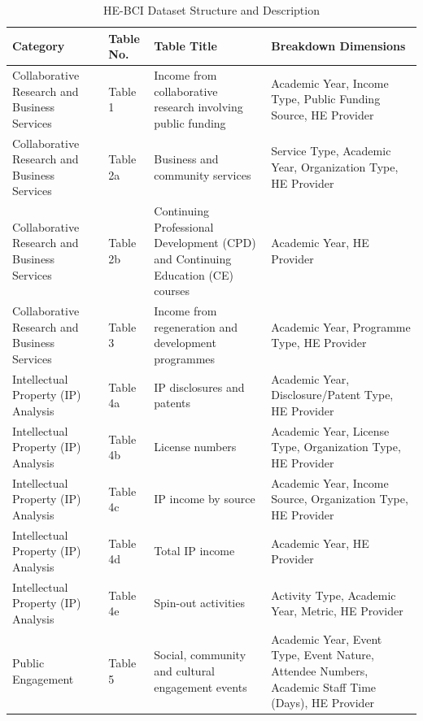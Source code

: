 \documentclass[journal,onecolumn, 10pt,draftclsnofoot]{IEEEtran}
\begin{document}
\vspace{0.3cm}
\begin{table}[h]
\centering
\caption{HE-BCI Dataset Structure and Description}
\vspace{0.1cm}
\renewcommand{\arraystretch}{1.15}
\small
\begin{tabularx}{\textwidth}{|>{\raggedright\arraybackslash}p{3cm}
                                |>{\centering\arraybackslash}p{2cm}
                                |>{\raggedright\arraybackslash}p{5.2cm}
                                |>{\raggedright\arraybackslash}X|}
    \hline
    \textbf{Category} & \textbf{Table No.} & \textbf{Table Title} & \textbf{Breakdown Dimensions} \\
    \hline
    Collaborative Research and Business Services & Table 1 & Income from collaborative research involving public funding & Academic Year, Income Type, Public Funding Source, HE Provider \\
    \hline
    Collaborative Research and Business Services & Table 2a & Business and community services & Service Type, Academic Year, Organization Type, HE Provider \\
    \hline
    Collaborative Research and Business Services & Table 2b & Continuing Professional Development (CPD) and Continuing Education (CE) courses & Academic Year, HE Provider \\
    \hline
    Collaborative Research and Business Services & Table 3 & Income from regeneration and development programmes & Academic Year, Programme Type, HE Provider \\
    \hline
    Intellectual Property (IP) Analysis & Table 4a & IP disclosures and patents & Academic Year, Disclosure/Patent Type, HE Provider \\
    \hline
    Intellectual Property (IP) Analysis & Table 4b & License numbers & Academic Year, License Type, Organization Type, HE Provider \\
    \hline
    Intellectual Property (IP) Analysis & Table 4c & IP income by source & Academic Year, Income Source, Organization Type, HE Provider \\
    \hline
    Intellectual Property (IP) Analysis & Table 4d & Total IP income & Academic Year, HE Provider \\
    \hline
    Intellectual Property (IP) Analysis & Table 4e & Spin-out activities & Activity Type, Academic Year, Metric, HE Provider \\
    \hline
    Public Engagement & Table 5 & Social, community and cultural engagement events & Academic Year, Event Type, Event Nature, Attendee Numbers, Academic Staff Time (Days), HE Provider \\
    \hline
\end{tabularx}
\label{tab:dataset-overview}
\end{table}
\end{document}

